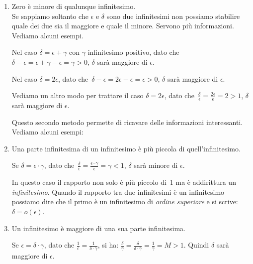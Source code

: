 \begin{enumerate}
 \item Zero è minore di qualunque infinitesimo.\\
  Se sappiamo soltanto che $\epsilon$ e $\delta$ sono due infinitesimi 
  non possiamo stabilire quale dei due sia il maggiore e quale il minore. 
  Servono più informazioni. Vediamo alcuni esempi.

  \begin{esempio}
   Nel caso $\delta = \epsilon + \gamma$ con $\gamma$ infinitesimo positivo, 
   dato che~$\delta-\epsilon=\epsilon+\gamma-\epsilon=\gamma>0$, 
   $\delta$ sarà maggiore di $\epsilon$.
  \end{esempio}

  \begin{esempio}
   Nel caso $\delta = 2\epsilon$, 
   dato che~$\delta-\epsilon=2\epsilon-\epsilon=\epsilon>0$, 
   $\delta$ sarà maggiore di $\epsilon$.
  \end{esempio}

  \begin{esempio}
   Vediamo un altro modo per trattare il caso $\delta = 2\epsilon$, 
   dato che~$\frac{\delta}{\epsilon}=\frac{2\epsilon}{\epsilon}=2>1$, 
   $\delta$ sarà maggiore di $\epsilon$.
  \end{esempio}

  Questo secondo metodo permette di ricavare delle informazioni interessanti. 
  Vediamo alcuni esempi:

 \item Una parte infinitesima di un infinitesimo è più piccola di 
quell'infinitesimo.
  \begin{esempio}
   Se $\delta = \epsilon \cdot \gamma$, dato 
   che~$\frac{\delta}{\epsilon}=\frac{\epsilon \cdot 
\gamma}{\epsilon}=\gamma<1$, 
   $\delta$ sarà minore di $\epsilon$.
  \end{esempio}

  \begin{osservazione}
   In questo caso il rapporto non solo è più piccolo di~1 ma è addirittura un 
   \emph{infinitesimo}. 
   Quando il rapporto tra due infinitesimi è un infinitesimo 
   possiamo dire che il primo è un infinitesimo di \emph{ordine superiore} e 
si 
   scrive:~$\delta=o(\epsilon)$.
  \end{osservazione}

 \item Un infinitesimo è maggiore di una sua parte infinitesima.

  \begin{esempio}
   Se $\epsilon=\delta\cdot\gamma$, dato che 
   $\frac{1}{\epsilon}=\frac{1}{\delta\cdot \gamma}$, si ha:
   $\frac{\delta}{\gamma}=\frac{\delta}{\delta\cdot \gamma}=
   \frac{1}{\gamma}=M>1$. Quindi $\delta $ sarà maggiore di $\epsilon$.
  \end{esempio}


\end{enumerate}
